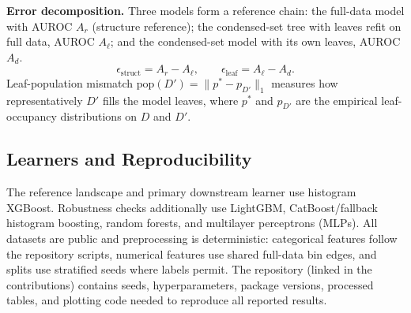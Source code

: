 \textbf{Error decomposition.}
Three models form a reference chain: the full-data model with AUROC $A_r$
(structure reference); the condensed-set tree with leaves refit on full data,
AUROC $A_\ell$; and the condensed-set model with its own leaves, AUROC $A_d$.
\begin{equation}
\epsilon_{\mathrm{struct}} = A_r - A_\ell,\qquad
\epsilon_{\mathrm{leaf}}   = A_\ell - A_d.
\label{eq:decomp}
\end{equation}
Leaf-population mismatch $\mathrm{pop}(D')=\|p^*-p_{D'}\|_1$ measures how
representatively $D'$ fills the model leaves, where $p^*$ and $p_{D'}$ are the
empirical leaf-occupancy distributions on $D$ and $D'$.

\subsection{Learners and Reproducibility}

The reference landscape and primary downstream learner use histogram XGBoost.
Robustness checks additionally use LightGBM, CatBoost/fallback histogram
boosting, random forests, and multilayer perceptrons (MLPs). All datasets are
public and preprocessing is deterministic: categorical features follow the
repository scripts, numerical features use shared full-data bin edges, and
splits use stratified seeds where labels permit. The repository (linked in the contributions) contains seeds, hyperparameters,
package versions, processed tables, and plotting code needed to reproduce all
reported results.
